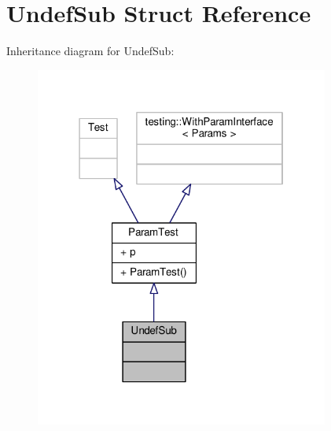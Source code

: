 \hypertarget{struct_undef_sub}{}\section{Undef\+Sub Struct Reference}
\label{struct_undef_sub}


Inheritance diagram for Undef\+Sub\+:
\nopagebreak
\begin{figure}[H]
\begin{center}
\leavevmode
\includegraphics[width=274pt]{struct_undef_sub__inherit__graph}
\end{center}
\end{figure}


